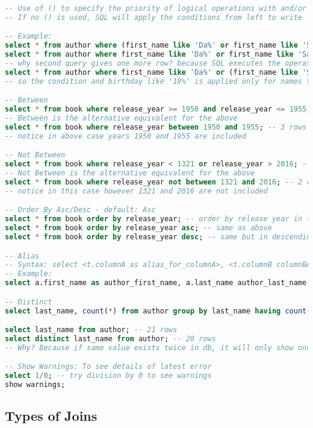 \begin{lstlisting}[language=SQL]
-- Use of () to specify the priority of logical operations with and/or
-- If no () is used, SQL will apply the conditions from left to write

-- Example:
select * from author where (first_name like 'Da%' or first_name like 'Sa%') and birthday like '19%'; -- 2 rows
select * from author where first_name like 'Da%' or first_name like 'Sa%' and birthday like '19%'; -- 3 rows
-- why second query gives one more row? because SQL executes the operations from left to write so it's equivalent to below
select * from author where first_name like 'Da%' or (first_name like 'Sa%' and birthday like '19%'); -- 3 rows
-- so the condition and birthday like '19%' is applied only for names that start with Sa

-- Between
select * from book where release_year >= 1950 and release_year <= 1955; -- 3 rows
-- Between is the alternative equivalent for the above
select * from book where release_year between 1950 and 1955; -- 3 rows
-- notice in above case years 1950 and 1955 are included

-- Not Between
select * from book where release_year < 1321 or release_year > 2016; -- 2 rows
-- Not Between is the alternative equivalent for the above
select * from book where release_year not between 1321 and 2016; -- 2 rows
-- notice in this case however 1321 and 2016 are not included

-- Order By Asc/Desc - default: Asc
select * from book order by release_year; -- order by release year in (default) ascending order
select * from book order by release_year asc; -- same as above
select * from book order by release_year desc; -- same but in descending order now

-- Alias
-- Syntax: select <t.columnA as alias_for_columnA>, <t.columnB columnBAlias> from <table as t>;
-- Example:
select a.first_name as author_first_name, a.last_name author_last_name from author as a;

-- Distinct
select last_name, count(*) from author group by last_name having count(*) > 1; -- notice Bronte name exists twice

select last_name from author; -- 21 rows
select distinct last_name from author; -- 20 rows
-- Why? Because if same value exists twice in db, it will only show once with distinct - in this case it's Bronte

-- Show Warnings: To see details of latest error
select 1/0; -- try division by 0 to see warnings
show warnings;
\end{lstlisting}
\subsection{Types of Joins}
